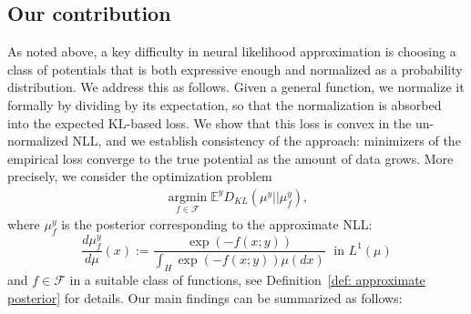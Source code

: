 \documentclass{amsart}
\theoremstyle{definition}
\newcommand{\E}{{\mathbb E}}
\newcommand{\F}{\mathcal{F}}
\newcommand{\KL}[2]{D_{KL}\left(#1 || #2\right)}
\newcommand{\argmin}{\operatorname*{argmin}}
\begin{document}
\subsection{Our contribution}\label{ss:Contribution}
As noted above, a key difficulty in neural likelihood approximation is choosing a class of potentials that is both expressive enough and normalized as a probability distribution.
We address this as follows. Given a general function, we normalize it formally by dividing by its expectation, so that the normalization is absorbed into the expected KL-based loss. We show that this loss is convex in the un-normalized NLL, and we establish consistency of the approach: minimizers of the empirical loss converge to the true potential as the amount of data grows.
More precisely, we consider the optimization problem
    \begin{eqnarray}\label{eq: objective}
        \argmin_{f \in \F} \E^{y}\KL{\mu^y}{\mu^y_f},
    \end{eqnarray}
    where $\mu^y_f$ is the posterior corresponding to the approximate NLL:
    \begin{equation}\label{eq: posterior corresponding to f}
    \frac{d \mu^y_f}{d \mu}(x) :=\frac{\exp \left( -f(x; y) \right) }{\int_H \exp(-f(x;y)) \mu(dx)} \; \text{ in } L^1(\mu) 
\end{equation}
and $f\in \F$ in a suitable class of functions, see Definition~\ref{def: approximate posterior} for details.
Our main findings can be summarized as follows:
\end{document}
